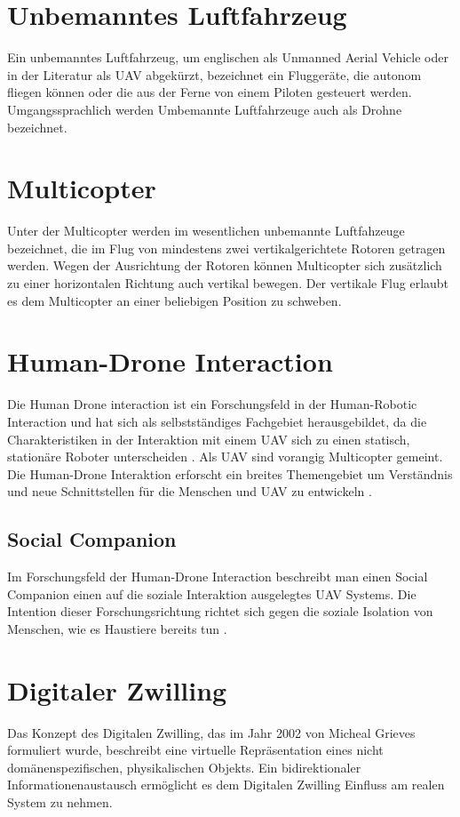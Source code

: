 
\section{Unbemanntes Luftfahrzeug}
Ein unbemanntes Luftfahrzeug, um englischen als Unmanned Aerial Vehicle oder in der Literatur als UAV abgekürzt, bezeichnet ein Fluggeräte, die autonom fliegen können oder die aus der Ferne von einem Piloten gesteuert werden. Umgangssprachlich werden Umbemannte Luftfahrzeuge auch als Drohne bezeichnet.

\section{Multicopter}
Unter der Multicopter werden im wesentlichen unbemannte Luftfahzeuge bezeichnet, die im Flug von mindestens zwei vertikalgerichtete Rotoren getragen werden. Wegen der Ausrichtung der Rotoren können Multicopter sich zusätzlich zu einer horizontalen Richtung auch vertikal bewegen. Der vertikale Flug erlaubt es dem Multicopter an einer beliebigen Position zu schweben. 


\section{Human-Drone Interaction}
Die Human Drone interaction ist ein Forschungsfeld in der  Human-Robotic Interaction und hat sich als selbstständiges Fachgebiet herausgebildet, da die Charakteristiken in der Interaktion mit einem UAV sich zu einen statisch, stationäre Roboter unterscheiden \cite{Tezza2019TheStaOfArtHumDro}. Als UAV sind vorangig Multicopter gemeint.
Die Human-Drone Interaktion erforscht ein breites Themengebiet um Verständnis und neue Schnittstellen für die Menschen und UAV zu entwickeln .

\subsection{Social Companion}
Im Forschungsfeld der Human-Drone Interaction beschreibt man  einen Social Companion einen auf die soziale Interaktion ausgelegtes UAV Systems. Die Intention dieser Forschungsrichtung richtet sich gegen die soziale Isolation von Menschen, wie es Haustiere bereits tun \cite{Ghafu2021SocCom}.

\section{Digitaler Zwilling}
Das Konzept des Digitalen Zwilling, das im Jahr 2002 von Micheal Grieves formuliert wurde, beschreibt eine virtuelle Repräsentation eines nicht domänenspezifischen, physikalischen Objekts. 
Ein bidirektionaler Informationenaustausch ermöglicht es dem Digitalen Zwilling Einfluss am realen System zu nehmen. 


